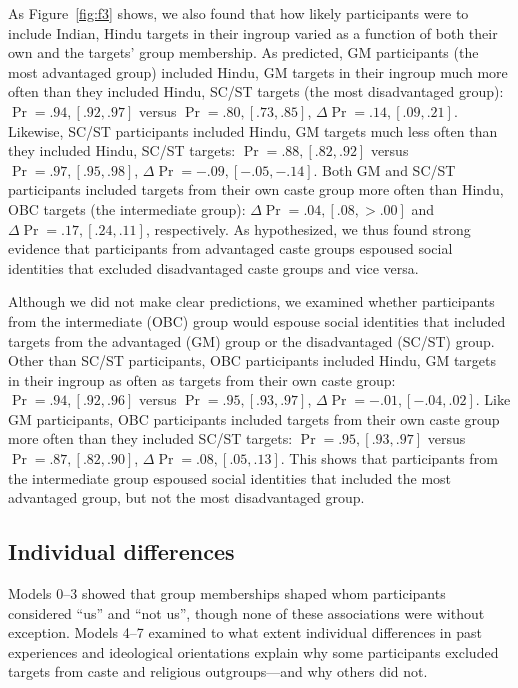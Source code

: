 \documentclass[12pt, a4paper]{article}
\begin{document}
As Figure~\ref{fig:f3} shows, we also found that how likely participants were to include Indian, Hindu targets in their ingroup varied as a function of both their own and the targets’ group membership. As predicted, GM participants (the most advantaged group) included Hindu, GM targets in their ingroup much more often than they included Hindu, SC/ST targets (the most disadvantaged group): $\Pr = .94, [.92, .97]$ versus $\Pr  = .80, [.73, .85]$, $\Delta\Pr = .14, [.09, .21]$. Likewise, SC/ST participants included Hindu, GM targets much less often than they included Hindu, SC/ST targets: $\Pr = .88, [.82, .92]$ versus $\Pr = .97, [.95, .98]$, $\Delta\Pr = -.09, [-.05, -.14]$. Both GM and SC/ST participants included targets from their own caste group more often than Hindu, OBC targets (the intermediate group): $\Delta\Pr = .04, [.08, >.00]$ and $\Delta\Pr = .17, [.24, .11]$, respectively. As hypothesized, we thus found strong evidence that participants from advantaged caste groups espoused social identities that excluded disadvantaged caste groups and vice versa.

Although we did not make clear predictions, we examined whether participants from the intermediate (OBC) group would espouse social identities that included targets from the advantaged (GM) group or the disadvantaged (SC/ST) group. Other than SC/ST participants, OBC participants included Hindu, GM targets in their ingroup as often as targets from their own caste group:  $\Pr = .94, [.92, .96]$ versus $\Pr = .95, [.93, .97]$, $\Delta\Pr = -.01, [-.04, .02]$. Like GM participants, OBC participants included targets from their own caste group more often than they included SC/ST targets:  $\Pr = .95, [.93, .97]$ versus $\Pr = .87, [.82, .90]$, $\Delta\Pr = .08, [.05, .13]$. This shows that participants from the intermediate group espoused social identities that included the most advantaged group, but not the most disadvantaged group.

\subsection{Individual differences}

Models 0--3 showed that group memberships shaped whom participants considered “us” and “not us”, though none of these associations were without exception. Models 4--7 examined to what extent individual differences in past experiences and ideological orientations explain why some participants excluded targets from caste and religious outgroups---and why others did not.
\end{document}

